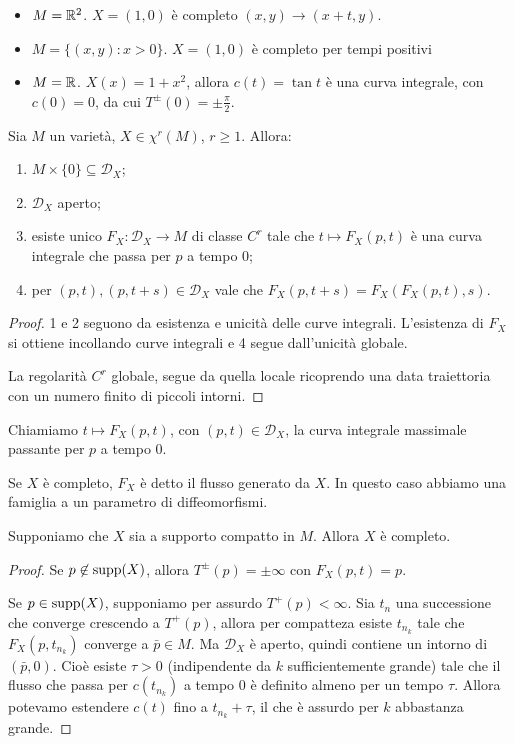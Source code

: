 \begin{example}
\begin{itemize}
	\item $M=\mathbb R^2$. $X=(1,0)$ è completo $(x,y)\to (x+t,y)$.
	\item $M=\{(x,y):x>0\}$. $X=(1,0)$ è completo per tempi positivi
	\item $M=\mathbb R$. $X(x)=1+x^2$, allora $c(t)=\tan t$ è una curva integrale, con $c(0)=0$, da cui $T^\pm(0)=\pm \frac \pi 2$.
\end{itemize}
\end{example}

\begin{proposition}
	Sia $M$ un varietà, $X\in \chi^r(M)$, $r\ge 1$. Allora:
	\begin{enumerate}
	 \item $M\times\{0\}\subseteq \mathcal D_X$;
	 \item $\mathcal D_X$ aperto;
	 \item esiste unico $F_X:\mathcal D_X\to M$ di classe $C^r$ tale che $t\mapsto F_X(p,t)$ è una curva integrale che passa per $p$ a tempo 0;
	 \item per $(p,t),(p,t+s)\in\mathcal D_X$ vale che $F_X(p,t+s)=F_X(F_X(p,t),s)$.
	\end{enumerate}
\end{proposition}

\begin{proof}
	1 e 2 seguono da esistenza e unicità delle curve integrali. L'esistenza di $F_X$ si ottiene incollando curve integrali e 4 segue dall'unicità globale.
	
	La regolarità $C^r$ globale, segue da quella locale ricoprendo una data traiettoria con un numero finito di piccoli intorni.
\end{proof}

\begin{definition}
	Chiamiamo $t\mapsto F_X(p,t)$, con $(p,t)\in\mathcal D_X$, la curva integrale massimale passante per $p$ a tempo 0.
	
	Se $X$ è completo, $F_X$ è detto il flusso generato da $X$. In questo caso abbiamo una famiglia a un parametro di diffeomorfismi.
\end{definition}

\begin{proposition}
	Supponiamo che $X$ sia a supporto compatto in $M$. Allora $X$ è completo.
\end{proposition}

\begin{proof}
	Se $p\not \in\operatorname{supp} (X)$, allora $T^{\pm}(p)=\pm\infty$ con $F_X(p,t)=p$.
	
	Se $p\in\operatorname{supp}(X)$, supponiamo per assurdo $T^+(p)<\infty$. Sia $t_n$ una successione che converge crescendo a $T^+(p)$, allora per compatteza esiste $t_{n_k}$ tale che $F_X(p,t_{n_k})$ converge a $\bar p\in M$.
	Ma $\mathcal D_X$ è aperto, quindi contiene un intorno di $(\bar p,0)$.
	Cioè esiste $\tau >0$ (indipendente da $k$ sufficientemente grande) tale che il flusso che passa per $c(t_{n_k})$ a tempo 0 è definito almeno per un tempo $\tau$.
	Allora potevamo estendere $c(t)$ fino a $t_{n_k}+\tau$, il che è assurdo per $k$ abbastanza grande.
\end{proof}


